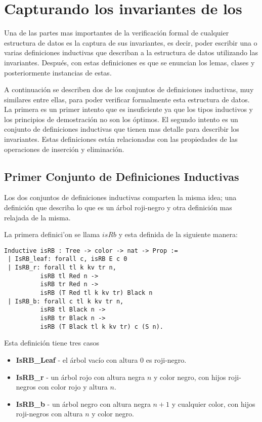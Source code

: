 \documentclass[letterpaper,12pt,oneside]{book}
\newcommand{\arn}{árbol roji-negro}
\theoremstyle{plain}
\theoremstyle{definition}
\theoremstyle{remark}
\begin{document}
\section{Capturando los invariantes de los {\ARNs}}
Una de las partes mas importantes de la verificaci\'on formal de cualquier estructura de datos es la captura de sus invariantes,
es decir, poder escribir una o varias definiciones inductivas que describan a la estructura de datos utilizando las invariantes. Después, con estas definiciones es que se enuncian los lemas, clases y posteriormente instancias de estas. 

A continuaci\'on se describen dos de los conjuntos de definiciones inductivas, muy similares entre ellas, para poder verificar formalmente esta estructura de datos. La primera es un primer intento que es insuficiente ya que los tipos inductivos y los principios de demostraci\'on no son los \'optimos. El segundo intento es un conjunto de definiciones inductivas que tienen mas detalle para describir los invariantes. Estas definiciones est\'an relacionadas con las propiedades de las operaciones de inserci\'on y eliminaci\'on. 

\subsection{Primer Conjunto de Definiciones Inductivas}
Los dos conjuntos de definiciones inductivas comparten la misma idea; una definici\'on que describa lo que es un {{{\arn}}} y otra definici\'on mas relajada de la misma.

La primera definici'on se llama $isRb$ y esta definida de la siguiente manera: 
\begin{verbatim}
Inductive isRB : Tree -> color -> nat -> Prop :=
 | IsRB_leaf: forall c, isRB E c 0
 | IsRB_r: forall tl k kv tr n,
          isRB tl Red n ->
          isRB tr Red n ->
          isRB (T Red tl k kv tr) Black n
 | IsRB_b: forall c tl k kv tr n,
          isRB tl Black n ->
          isRB tr Black n ->
          isRB (T Black tl k kv tr) c (S n).
\end{verbatim}
Esta definici\'on tiene tres casos
\begin{itemize}
        \item \textbf{IsRB\_Leaf} - el árbol vacío con altura 0 es roji-negro.
        \item \textbf{IsRB\_r} - un árbol rojo con altura negra $n$ y color negro, con hijos roji-negros con color rojo y altura $n$.
        \item \textbf{IsRB\_b} - un árbol negro con altura negra $n+1$ y cualquier color, con hijos roji-negros con altura $n$ y color negro.  
\end{itemize}
\end{document}
